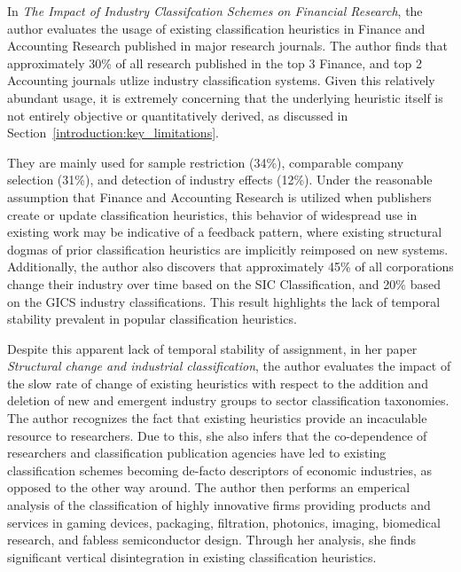 \documentclass[../main.tex]{subfiles}
\begin{document}
In \textit{The Impact of Industry Classifcation Schemes on Financial Research}, the author evaluates the usage of existing classification heuristics in Finance and Accounting Research published in major research journals. The author finds that approximately 30\% of all research published in the top 3 Finance, and top 2 Accounting journals utlize industry classification systems. Given this relatively abundant usage, it is extremely concerning that the underlying heuristic itself is not entirely objective or quantitatively derived, as discussed in Section~\ref{introduction:key_limitations}.

They are mainly used for sample restriction (34\%), comparable company selection (31\%), and detection of industry effects (12\%). Under the reasonable assumption that Finance and Accounting Research is utilized when publishers create or update classification heuristics, this behavior of widespread use in existing work may be indicative of a feedback pattern, where existing structural dogmas of prior classification heuristics are implicitly reimposed on new systems. Additionally, the author also discovers that approximately 45\% of all corporations change their industry over time based on the SIC Classification, and 20\% based on the GICS industry classifications. This result highlights the lack of temporal stability prevalent in popular classification heuristics.

Despite this apparent lack of temporal stability of assignment, in her paper \textit{Structural change and industrial classification}, the author evaluates the impact of the slow rate of change of existing heuristics with respect to the addition and deletion of new and emergent industry groups to sector classification taxonomies. The author recognizes the fact that existing heuristics provide an incaculable resource to researchers. Due to this, she also infers that the co-dependence of researchers and classification publication agencies have led to existing classification schemes becoming de-facto descriptors of economic industries, as opposed to the other way around. The author then performs an emperical analysis of the classification of highly innovative firms providing products and services in gaming devices, packaging, filtration, photonics, imaging, biomedical research, and fabless semiconductor design. Through her analysis, she finds significant vertical disintegration in existing classification heuristics.
\end{document}
